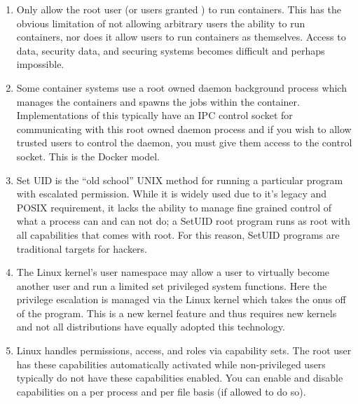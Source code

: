 \documentclass[letterpaper,10pt,english]{sphinxmanual}
\begin{document}
\begin{enumerate}
\item {} 
 Only allow the root user (or users granted )
to run containers. This has the obvious limitation of not allowing
arbitrary users the ability to run containers, nor does it allow
users to run containers as themselves. Access to data, security data,
and securing systems becomes difficult and perhaps impossible.

\item {} 
 Some container systems use a root
owned daemon background process which manages the containers and
spawns the jobs within the container. Implementations of this
typically have an IPC control socket for communicating with this root
owned daemon process and if you wish to allow trusted users to
control the daemon, you must give them access to the control socket.
This is the Docker model.

\item {} 
 Set UID is the “old school” UNIX method for running a
particular program with escalated permission. While it is widely used
due to it’s legacy and POSIX requirement, it lacks the ability to
manage fine grained control of what a process can and can not do; a
SetUID root program runs as root with all capabilities that comes
with root. For this reason, SetUID programs are traditional targets
for hackers.

\item {} 
 The Linux kernel’s user namespace may allow a
user to virtually become another user and run a limited set
privileged system functions. Here the privilege escalation is managed
via the Linux kernel which takes the onus off of the program. This is
a new kernel feature and thus requires new kernels and not all
distributions have equally adopted this technology.

\item {} 
 Linux handles permissions, access, and roles via
capability sets. The root user has these capabilities automatically
activated while non-privileged users typically do not have these
capabilities enabled. You can enable and disable capabilities on a
per process and per file basis (if allowed to do so).

\end{enumerate}
\end{document}
